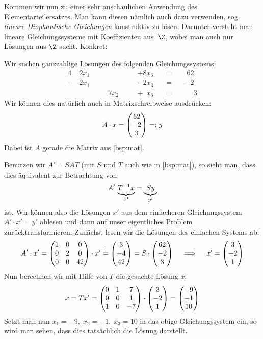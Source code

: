 Kommen wir nun zu einer sehr anschaulichen Anwendung des Elementarteilersatzes.
Man kann diesen nämlich auch dazu verwenden, sog. \emph{lineare Diophantische
Gleichungen} konstruktiv zu lösen. Darunter versteht man lineare
Gleichungssysteme mit Koeffizienten aus~$\Z$, wobei man auch nur Lösungen aus
$\Z$ sucht. Konkret:

\begin{thBeisp}
    Wir suchen ganzzahlige Lösungen des folgenden Gleichungssystems:
    \begin{alignat*}{4}
         &2x_1  &\quad&      &\quad&            +8x_3  &\quad=&\quad \; 62             \\
        -&2x_1  &\quad&      &\quad&            -2x_3  &\quad=&\quad            {-2}   \\
         &      &\quad& 7x_2 &\quad& +\phantom{1} x_3  &\quad=&\quad \phantom{+}  3
    \end{alignat*}
    Wir können dies natürlich auch in Matrixschreibweise ausdrücken:
    \[ A \cdot x = \begin{pmatrix} 62\\-2\\3 \end{pmatrix} =: y \]
    Dabei ist $A$ gerade die Matrix aus \cref{bsp:mat}.
    
    Benutzen wir $A' = S\!AT$ (mit $S$ und $T$ auch wie in \cref{bsp:mat}), so
    sieht man, dass dies äquivalent zur Betrachtung von
    \[ A' \, \underbrace{ T^{-1} x \vphantom{y} }_{x'} = \underbrace{Sy}_{y'} \]
    ist. Wir können also die Lösungen $x'$ aus dem einfacheren Gleichungssystem
    $A' \cdot x' = y'$ ablesen und dann auf unser eigentliches Problem
    zurücktransformieren. Zunächst lesen wir die Lösungen des einfachen Systems
    ab:
    \[ A' \cdot x' = \begin{pmatrix} 
                 1 &  0 &   0 \\
                 0 &  2 &   0 \\
                 0 &  0 &  42   \end{pmatrix} \cdot x' \overset{!}{=}
       \begin{pmatrix} 3\\-4\\42 \end{pmatrix} 
       = S \cdot \begin{pmatrix} 62\\-2\\3 \end{pmatrix}
       \quad
       \implies
       \quad
       x' = \begin{pmatrix} 3\\-2\\1 \end{pmatrix}  \]
    Nun berechnen wir mit Hilfe von $T$ die gesuchte Lösung $x$:
    \[ x = T x' = 
            \begin{pmatrix} 
             0 &  1 &  7 \\
             0 &  0 &  1 \\
             1 &  0 & -7   \end{pmatrix} \cdot \begin{pmatrix} 3\\-2\\1 \end{pmatrix}
         = \begin{pmatrix} -9\\-1\\10 \end{pmatrix} \]
    Setzt man nun $x_1 = -9,\; x_2 = -1,\; x_3 = 10$ in das obige
    Gleichungssystem ein, so wird man sehen, dass dies tatsächlich die
    Lösung darstellt.
\end{thBeisp}

